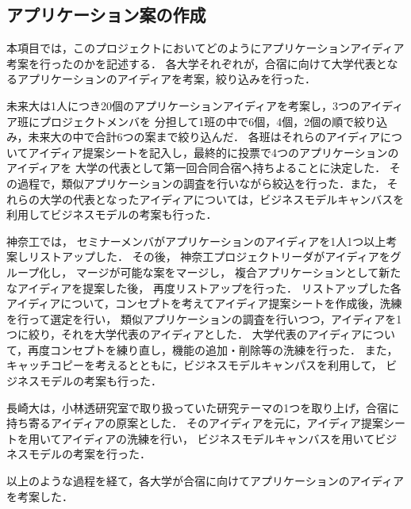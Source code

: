 \subsection{アプリケーション案の作成}

\par
本項目では，このプロジェクトにおいてどのようにアプリケーションアイディア考案を行ったのかを記述する．
各大学それぞれが，合宿に向けて大学代表となるアプリケーションのアイディアを考案，絞り込みを行った．

\par
未来大は1人につき20個のアプリケーションアイディアを考案し，3つのアイディア班にプロジェクトメンバを
分担して1班の中で6個，4個，2個の順で絞り込み，未来大の中で合計6つの案まで絞り込んだ．
各班はそれらのアイディアについてアイディア提案シートを記入し，最終的に投票で4つのアプリケーションのアイディアを
大学の代表として第一回合同合宿へ持ちよることに決定した．
その過程で，類似アプリケーションの調査を行いながら絞込を行った．また，
それらの大学の代表となったアイディアについては，ビジネスモデルキャンバスを利用してビジネスモデルの考案も行った．

\par
神奈工では， セミナーメンバがアプリケーションのアイディアを1人1つ以上考案しリストアップした．
その後， 神奈工プロジェクトリーダがアイディアをグループ化し， マージが可能な案をマージし，
複合アプリケーションとして新たなアイディアを提案した後， 再度リストアップを行った．
リストアップした各アイディアについて，コンセプトを考えてアイディア提案シートを作成後，洗練を行って選定を行い，
類似アプリケーションの調査を行いつつ，アイディアを1つに絞り，それを大学代表のアイディアとした．
大学代表のアイディアについて，再度コンセプトを練り直し，機能の追加・削除等の洗練を行った．
また，キャッチコピーを考えるとともに，ビジネスモデルキャンパスを利用して， ビジネスモデルの考案も行った．

\par 
長崎大は，小林透研究室で取り扱っていた研究テーマの1つを取り上げ，合宿に持ち寄るアイディアの原案とした．
そのアイディアを元に，アイディア提案シートを用いてアイディアの洗練を行い，
ビジネスモデルキャンバスを用いてビジネスモデルの考案を行った．

\par
以上のような過程を経て，各大学が合宿に向けてアプリケーションのアイディアを考案した．
